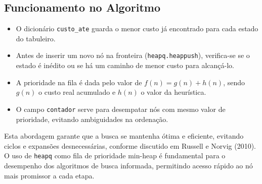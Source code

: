 \subsection{Funcionamento no Algoritmo}  
  
\begin{itemize}  
    \item O dicionário \texttt{custo\_ate} guarda o menor custo já encontrado para cada estado do tabuleiro.  
    \item Antes de inserir um novo nó na fronteira (\texttt{heapq.heappush}), verifica-se se o estado é inédito ou se há um caminho de menor custo para alcançá-lo.  
    \item A prioridade na fila é dada pelo valor de $f(n) = g(n) + h(n)$, sendo $g(n)$ o custo real acumulado e $h(n)$ o valor da heurística.  
    \item O campo \texttt{contador} serve para desempatar nós com mesmo valor de prioridade, evitando ambiguidades na ordenação.  
\end{itemize}  
  
Esta abordagem garante que a busca se mantenha ótima e eficiente, evitando ciclos e expansões desnecessárias, conforme discutido em Russell e Norvig (2010). O uso de \texttt{heapq} como fila de prioridade min-heap é fundamental para o desempenho dos algoritmos de busca informada, permitindo acesso rápido ao nó mais promissor a cada etapa.  
  
  
